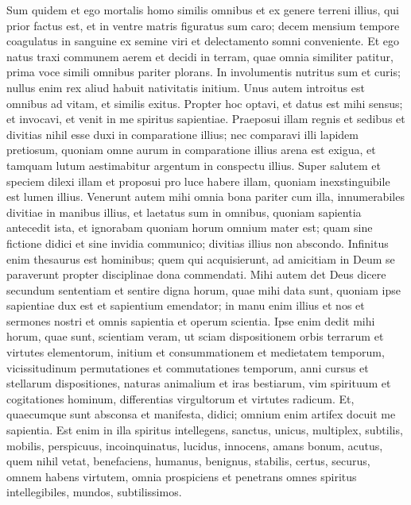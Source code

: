 \begin{biblechapter}  
\verse Sum quidem et ego mortalis homo similis omnibus et ex genere terreni illius, qui prior factus est, et in ventre matris figuratus sum caro; 
\verse decem mensium tempore coagulatus in sanguine ex semine viri et delectamento somni conveniente. 
\verse Et ego natus traxi communem aerem et decidi in terram, quae omnia similiter patitur, prima voce simili omnibus pariter plorans. 
\verse In involumentis nutritus sum et curis; 
\verse nullus enim rex aliud habuit nativitatis initium. 
\verse Unus autem introitus est omnibus ad vitam, et similis exitus. 
\verse Propter hoc optavi, et datus est mihi sensus; et invocavi, et venit in me spiritus sapientiae. 
\verse Praeposui illam regnis et sedibus et divitias nihil esse duxi in comparatione illius; 
\verse nec comparavi illi lapidem pretiosum, quoniam omne aurum in comparatione illius arena est exigua, et tamquam lutum aestimabitur argentum in conspectu illius. 
\verse Super salutem et speciem dilexi illam et proposui pro luce habere illam, quoniam inexstinguibile est lumen illius. 
\verse Venerunt autem mihi omnia bona pariter cum illa, innumerabiles divitiae in manibus illius, 
\verse et laetatus sum in omnibus, quoniam sapientia antecedit ista, et ignorabam quoniam horum omnium mater est; 
\verse quam sine fictione didici et sine invidia communico; divitias illius non abscondo. 
\verse Infinitus enim thesaurus est hominibus; quem qui acquisierunt, ad amicitiam in Deum se paraverunt propter disciplinae dona commendati. 
\verse Mihi autem det Deus dicere secundum sententiam et sentire digna horum, quae mihi data sunt, quoniam ipse sapientiae dux est et sapientium emendator; 
\verse in manu enim illius et nos et sermones nostri et omnis sapientia et operum scientia. 
\verse Ipse enim dedit mihi horum, quae sunt, scientiam veram, ut sciam dispositionem orbis terrarum et virtutes elementorum, 
\verse initium et consummationem et medietatem temporum, vicissitudinum permutationes et commutationes temporum, 
\verse anni cursus et stellarum dispositiones, 
\verse naturas animalium et iras bestiarum, vim spirituum et cogitationes hominum, differentias virgultorum et virtutes radicum. 
\verse Et, quaecumque sunt absconsa et manifesta, didici; omnium enim artifex docuit me sapientia. 
\verse Est enim in illa spiritus intellegens, sanctus, unicus, multiplex, subtilis, mobilis, perspicuus, incoinquinatus, lucidus, innocens, amans bonum, acutus, 
\verse quem nihil vetat, benefaciens, humanus, benignus, stabilis, certus, securus, omnem habens virtutem, omnia prospiciens et penetrans omnes spiritus intellegibiles, mundos, subtilissimos. 

\end{biblechapter}
